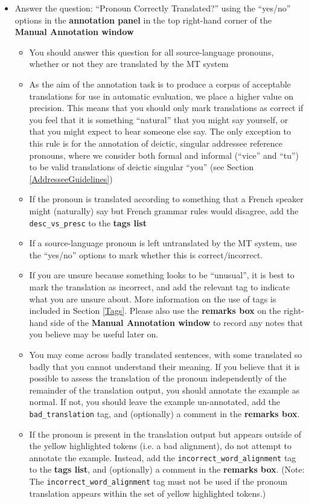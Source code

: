 \documentclass[11pt]{article} %
\newcommand\tag[1]{\texttt{#1}}
\begin{document}
\begin{itemize}
  \item Answer the question: ``Pronoun Correctly Translated?'' using the ``yes/no'' options in the \textbf{annotation panel} in the top right-hand corner of the \textbf{Manual Annotation window}
  \begin{itemize}
    \item You should answer this question for all source-language pronouns, whether or not they are translated by the MT system
    \item As the aim of the annotation task is to produce a corpus of acceptable translations for use in automatic evaluation, we place a higher value on precision. This means that you should only mark translations as correct if you feel that it is something ``natural'' that you might say yourself, or that you might expect to hear someone else say. The only exception to this rule is for the annotation of deictic, singular addressee reference pronouns, where we consider both formal and informal (``vice'' and ``tu'') to be valid translations of deictic singular ``you'' (see Section \ref{AddresseeGuidelines})
    \item If the pronoun is translated according to something that a French speaker might (naturally) say but French grammar rules would disagree, add the \tag{desc\_vs\_presc} to the \textbf{tags list}
    \item If a source-language pronoun is left untranslated by the MT system, use the ``yes/no'' options to mark whether this is correct/incorrect.
    \item If you are unsure because something looks to be ``unusual'', it is best to mark the translation as incorrect, and add the relevant tag to indicate what you are unsure about. More information on the use of tags is included in Section \ref{Tags}. Please also use the \textbf{remarks box} on the right-hand side of the \textbf{Manual Annotation window} to record any notes that you believe may be useful later on.
    \item You may come across badly translated sentences, with some translated so badly that you cannot understand their meaning. If you believe that it is possible to assess the translation of the pronoun independently of the remainder of the translation output, you should annotate the example as normal. If not, you should leave the example un-annotated, add the \tag{bad\_translation} tag, and (optionally) a comment in the \textbf{remarks box}.
    \item If the pronoun is present in the translation output but appears outside of the yellow highlighted tokens (i.e. a bad alignment), do not attempt to annotate the example. Instead, add the \tag{incorrect\_word\_alignment} tag to the \textbf{tags list}, and (optionally) a comment in the \textbf{remarks box}. (Note: The \tag{incorrect\_word\_alignment} tag must not be used if the pronoun translation appears within the set of yellow highlighted tokens.)

\end{itemize}
\end{itemize}
\end{document}
